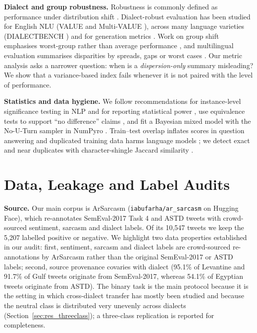 \documentclass[11pt]{article}
\begin{document}
\textbf{Dialect and group robustness.} Robustness is commonly defined as performance under distribution shift \cite{ref8,ref9,koh2021wilds}. Dialect-robust evaluation has been studied for English NLU (VALUE and Multi-VALUE \cite{ziems2022value,ziems2023multivalue}), across many language varieties (DIALECTBENCH \cite{faisal2024dialectbench}) and for generation metrics \cite{ref10}. Work on group shift emphasises worst-group rather than average performance \cite{sagawa2020groupdro,koh2021wilds}, and multilingual evaluation summarises disparities by spreads, gaps or worst cases \cite{hu2020xtreme,choudhury2021fair,blasi2022inequalities}. Our metric analysis asks a narrower question: when is a \emph{dispersion-only} summary misleading? We show that a variance-based index fails whenever it is not paired with the level of performance.

\textbf{Statistics and data hygiene.} We follow recommendations for instance-level significance testing in NLP \cite{dror2018hitchhiker} and for reporting statistical power \cite{card2020power}, use equivalence tests to support ``no difference'' claims \cite{lakens2017equivalence}, and fit a Bayesian mixed model with the No-U-Turn sampler \cite{hoffman2014nuts} in NumPyro \cite{phan2019numpyro}. Train--test overlap inflates scores in question answering \cite{lewis2021overlap} and duplicated training data harms language models \cite{lee2022dedup}; we detect exact and near duplicates with character-shingle Jaccard similarity \cite{broder1997minhash}.

\section{Data, Leakage and Label Audits}
\label{sec:dataset}
\textbf{Source.} Our main corpus is ArSarcasm \cite{abufarha2020arsarcasm} (\texttt{iabufarha/ar\_sarcasm} on Hugging Face), which re-annotates SemEval-2017 Task 4 \cite{rosenthal2017semeval} and ASTD \cite{nabil2015astd} tweets with crowd-sourced sentiment, sarcasm and dialect labels. Of its 10,547 tweets we keep the 5,207 labelled positive or negative. We highlight two data properties established in our audit: first, sentiment, sarcasm and dialect labels are crowd-sourced re-annotations by ArSarcasm rather than the original SemEval-2017 or ASTD labels; second, source provenance covaries with dialect (95.1\% of Levantine and 91.7\% of Gulf tweets originate from SemEval-2017, whereas 54.1\% of Egyptian tweets originate from ASTD). The binary task is the main protocol because it is the setting in which cross-dialect transfer has mostly been studied and because the neutral class is distributed very unevenly across dialects (Section~\ref{sec:res_threeclass}); a three-class replication is reported for completeness.
\end{document}
